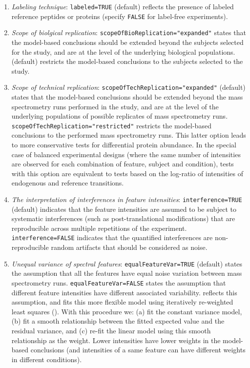 \documentclass[11pt]{article}
\begin{document}
\begin{enumerate}
\item {\it Labeling technique}: {\tt labeled=TRUE} (default) reflects the presence of labeled reference peptides or proteins (specify {\tt FALSE} for label-free experiments).

\item {\it Scope of biolgical replication}: {\tt scopeOfBioReplication="expanded"} states that the model-based conclusions should be extended beyond the subjects selected for the study, and are at the level of the underlying biological populations. (default) restricts the model-based conclusions to the subjects selected to the study.   

\item {\it Scope of technical replication}: {\tt scopeOfTechReplication="expanded"} (default) states that the model-based conclusions should be extended beyond the mass spectrometry runs performed in the study, and are at the level of the underlying populations of possible replicates of mass spectrometry runs. {\tt scopeOfTechReplication="restricted"} restricts the model-based conclusions to the performed mass spectrometry runs. This latter option leads to more conservative tests for differential protein abundance. In the special case of balanced experimental designs (where the same number of intensities are observed for each combination of feature, subject and condition), tests with this option are equivalent to tests based on the log-ratio of intensities of endogenous and reference transitions.

\item {\it The interpretation of interferences in feature intensities}: {\tt interference=TRUE} (default) indicates that the feature intensities are assumed to be subject to systematic interferences (such as post-translational modifications) that are reproducible across multiple repetitions of the experiment. {\tt interference=FALSE} indicates that the quantified interferences are non-reproducible random artifacts that should be considered as noise. 

\item {\it Unequal variance of spectral features}: {\tt equalFeatureVar=TRUE} (default) states the assumption that all the features have equal noise variation between mass spectrometry runs. {\tt equalFeatureVar=FALSE} states the assumption that different feature intensities have different associated variability. \m reflects this assumption, and fits this more flexible model using iteratively re-weighted least squares (\cite{Kutner5th}). With this procedure we: (a) fit the constant variance model, (b) fit a smooth relationship between the fitted expected value and the residual variance, and (c) re-fit the linear model using this smooth relationship as the weight. Lower intensities have lower weights in the model-based conclusions (and intensities of a same feature can have different weights in different conditions).


\end{enumerate}
\end{document}
